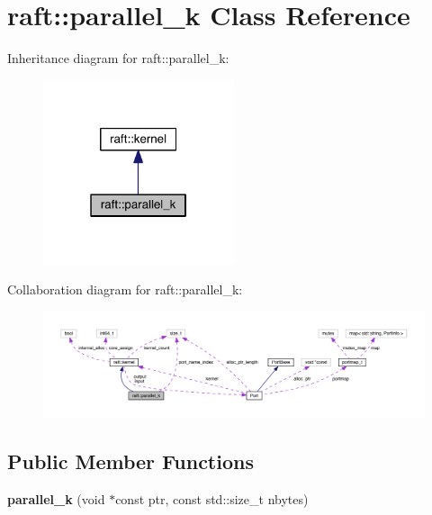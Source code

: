 \hypertarget{classraft_1_1parallel__k}{}\section{raft\+:\+:parallel\+\_\+k Class Reference}
\label{classraft_1_1parallel__k}


Inheritance diagram for raft\+:\+:parallel\+\_\+k\+:
\nopagebreak
\begin{figure}[H]
\begin{center}
\leavevmode
\includegraphics[width=159pt]{classraft_1_1parallel__k__inherit__graph}
\end{center}
\end{figure}


Collaboration diagram for raft\+:\+:parallel\+\_\+k\+:
\nopagebreak
\begin{figure}[H]
\begin{center}
\leavevmode
\includegraphics[width=350pt]{classraft_1_1parallel__k__coll__graph}
\end{center}
\end{figure}
\subsection*{Public Member Functions}
\begin{DoxyCompactItemize}
\item 
\hypertarget{classraft_1_1parallel__k_a7bc1c201f49ad35e35bffead39da7fc9}{}\label{classraft_1_1parallel__k_a7bc1c201f49ad35e35bffead39da7fc9} 
{\bfseries parallel\+\_\+k} (void $\ast$const ptr, const std\+::size\+\_\+t nbytes)
\end{DoxyCompactItemize}
